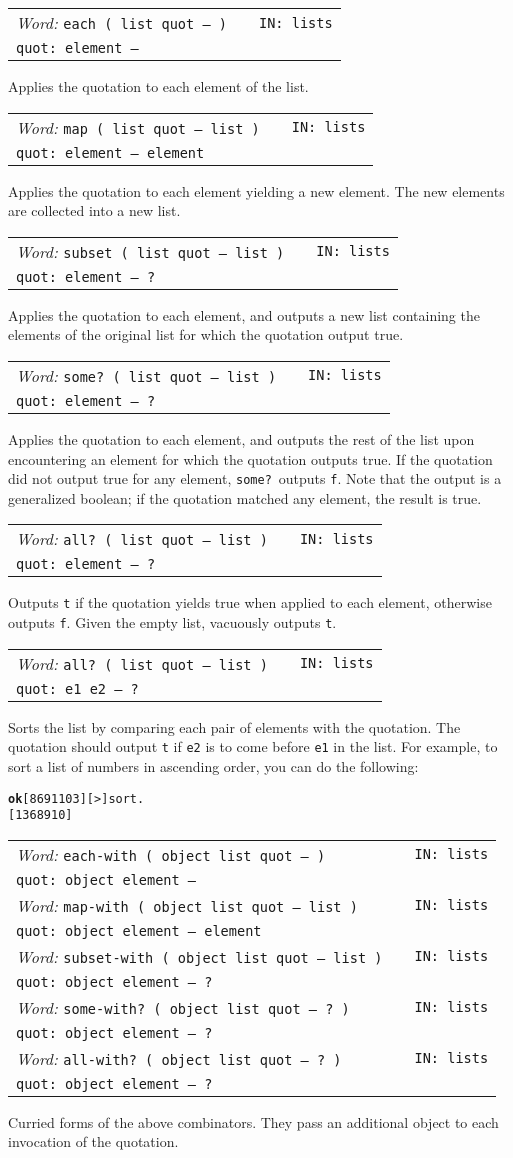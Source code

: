 \documentclass{report}
\newcommand{\ordinaryword}[3]{\index{#1}
\emph{Word:} \texttt{#2} &&\texttt{IN: #3}}
\newcommand{\wordtable}[1]{

\begin{tabularx}{12cm}[t]{lXr}
\hline
#1\\
\hline
\end{tabularx}

}
\begin{document}
\wordtable{
\ordinaryword{each}{each ( list quot -- )}{lists}\\
\texttt{quot:~element --}
}
Applies the quotation to each element of the list.
\wordtable{
\ordinaryword{map}{map ( list quot -- list )}{lists}\\
\texttt{quot:~element -- element}
}
Applies the quotation to each element yielding a new element. The new elements are collected into a new list.
\wordtable{
\ordinaryword{subset}{subset ( list quot -- list )}{lists}\\
\texttt{quot:~element -- ?}
}
Applies the quotation to each element, and outputs a new list containing the elements of the original list for which the quotation output true.
\wordtable{
\ordinaryword{some?}{some?~( list quot -- list )}{lists}\\
\texttt{quot:~element -- ?}
}
Applies the quotation to each element, and outputs the rest of the list upon encountering an element for which the quotation outputs true. If the quotation did not output true for any element, \texttt{some?}~outputs \texttt{f}. Note that the output is a generalized boolean; if the quotation matched any element, the result is true.
\wordtable{
\ordinaryword{all?}{all?~( list quot -- list )}{lists}\\
\texttt{quot:~element -- ?}
}
Outputs \texttt{t} if the quotation yields true when applied to each element, otherwise outputs \texttt{f}. Given the empty list, vacuously outputs \texttt{t}.
\wordtable{
\ordinaryword{sort}{all?~( list quot -- list )}{lists}\\
\texttt{quot:~e1 e2 -- ?}
}
Sorts the list by comparing each pair of elements with the quotation. The quotation should output \texttt{t} if \texttt{e2} is to come before \texttt{e1} in the list. For example, to sort a list of numbers in ascending order, you can do the following:
\begin{alltt}
\textbf{ok} [ 8 6 9 1 10 3 ] [ > ] sort .
[ 1 3 6 8 9 10 ]
\end{alltt}
\wordtable{
\ordinaryword{each-with}{each-with ( object list quot -- )}{lists}\\
\texttt{quot:~object element --}\\
\ordinaryword{map-with}{map-with ( object list quot -- list )}{lists}\\
\texttt{quot:~object element -- element}\\
\ordinaryword{subset-with}{subset-with ( object list quot -- list )}{lists}\\
\texttt{quot:~object element -- ?}\\
\ordinaryword{some-with?}{some-with?~( object list quot -- ?~)}{lists}\\
\texttt{quot:~object element -- ?}\\
\ordinaryword{all-with?}{all-with?~( object list quot -- ?~)}{lists}\\
\texttt{quot:~object element -- ?}
}
Curried forms of the above combinators. They pass an additional object to each invocation of the quotation.
\end{document}
